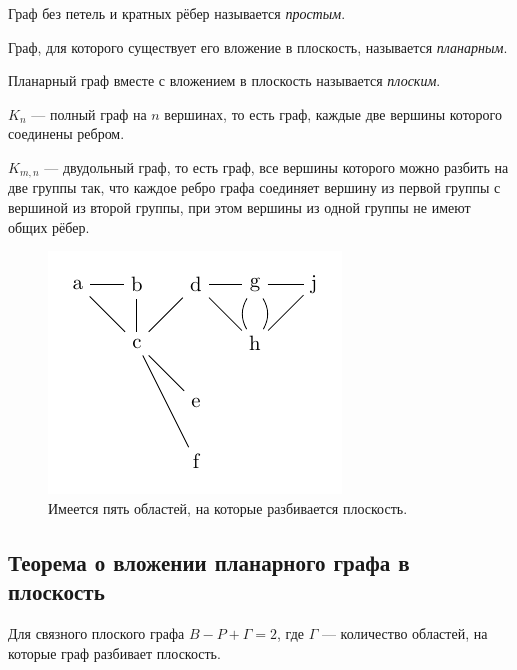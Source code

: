 \begin{definition} %
    Граф без петель и кратных рёбер называется \textit{простым}.
\end{definition}

\begin{definition}
    Граф, для которого существует его вложение в плоскость, называется \textit{планарным}.
\end{definition}

\begin{definition}
    Планарный граф вместе с вложением в плоскость называется \textit{плоским}.
\end{definition}

\begin{definition} %
    $K_n$ — полный граф на $n$ вершинах, то есть граф, каждые две вершины которого соединены ребром.

    $K_{m,n}$ — двудольный граф, то есть граф, все вершины которого можно разбить на две группы так, что каждое ребро графа соединяет вершину из первой группы с вершиной из второй группы, при этом вершины из одной группы не имеют общих рёбер.
\end{definition}

\begin{figure}[h]
    \centering
    \includegraphics[scale=2]{images/c3.5.pdf}
    \caption{Имеется пять областей, на которые разбивается плоскость.}
    \label{fig:c3.5}
\end{figure}


\subsection{Теорема о вложении планарного графа в плоскость}

\begin{theorem}
    Для связного плоского графа $B - P + \Gamma = 2$, где $\Gamma$ — количество областей, на которые граф разбивает плоскость.
\end{theorem}


